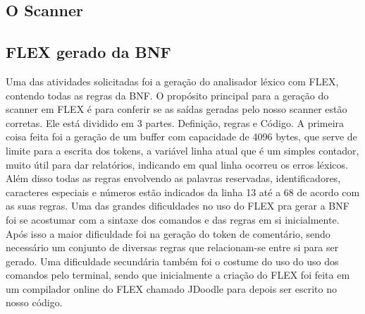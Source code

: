 \documentclass[12pt]{article}
\begin{document}
\subsection{O Scanner}

\subsection{FLEX gerado da BNF}

Uma das atividades solicitadas foi a geração do analisador léxico com FLEX, contendo todas as regras da BNF. 
O propósito principal para a geração do scanner em FLEX é para conferir se as saídas geradas pelo nosso scanner estão corretas. 
Ele está dividido em 3 partes. Definição, regras e Código. A primeira coisa feita foi a geração de um buffer com capacidade de 4096 bytes, 
que serve de limite para a escrita dos tokens, a variável linha atual que é um simples contador, muito útil para dar relatórios, 
indicando em qual linha ocorreu os erros léxicos. Além disso todas as regras envolvendo as palavras reservadas, identificadores, caracteres especiais e números estão indicados da linha 13 até a 68 de acordo com as suas regras. 
Uma das grandes dificuldades no uso do FLEX pra gerar a BNF foi se acostumar com a sintaxe dos comandos e das regras em si inicialmente. 
Após isso a maior dificuldade foi na geração do token de comentário, sendo necessário um conjunto de diversas regras que relacionam-se entre si para ser gerado. 
Uma dificuldade secundária também foi o costume do uso do uso dos comandos pelo terminal, sendo que inicialmente a criação do FLEX foi feita em um compilador online do FLEX chamado JDoodle para depois ser escrito no nosso código.
\end{document}
